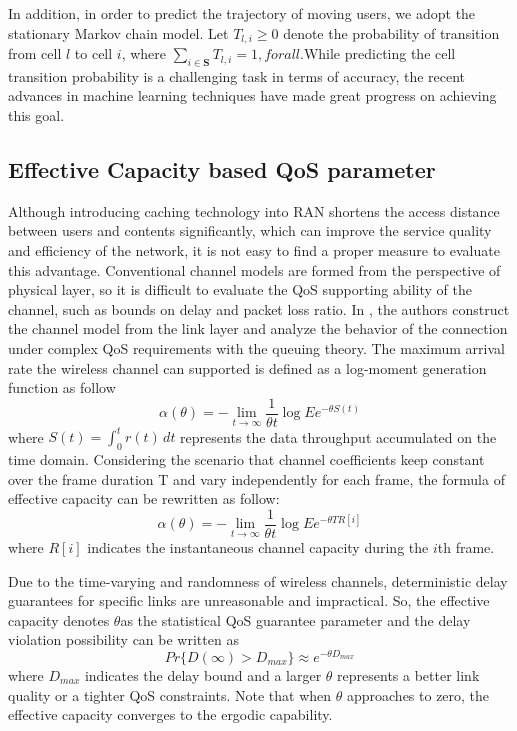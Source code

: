 \documentclass[conference]{IEEEtran}
\begin{document}
In addition, in order to predict the trajectory of moving users, we adopt the stationary Markov chain model. Let $T_{l,i}\ge 0$ denote the probability of transition from cell $l$ to cell $i$, where $\sum_{i\in\mathbf{S}}T_{l,i}=1, forall$.While predicting the cell transition probability is a challenging task in terms of accuracy, the recent advances in machine learning techniques have made great progress on achieving this goal.

\subsection{Effective Capacity based QoS parameter}
Although introducing caching technology into RAN shortens the access distance between users and contents significantly, which can improve the service quality and efficiency of the network, it is not easy to find a proper measure to evaluate this advantage. Conventional channel models are formed from the perspective of physical layer, so it is difficult to evaluate the QoS supporting ability of the channel, such as bounds on delay and packet loss ratio. In \cite{1210731}, the authors construct the channel model from the link layer and analyze the behavior of the connection under complex QoS requirements with the queuing theory. The maximum arrival rate the wireless channel can supported is defined as a log-moment generation function as follow
\begin{equation}
\alpha(\theta)=-\lim_{t \to \infty}\frac{1}{\theta t}\log E{e^{-\theta S(t)}}
\end{equation}
where $S(t)=\int_{0}^{t} r(t)\, dt$ represents the data throughput accumulated on the time domain. Considering the scenario that channel coefficients keep constant over the frame duration T and vary independently for each frame, the formula of effective capacity can be rewritten as follow:
\begin{equation}
\alpha(\theta)=-\lim_{t \to \infty}\frac{1}{\theta t}\log E{e^{-\theta TR[i]}}
\end{equation}
where $R[i]$ indicates the instantaneous channel capacity during the $i$th frame.

Due to the time-varying and randomness of wireless channels, deterministic delay guarantees for specific links are unreasonable and impractical. So, the effective capacity denotes
$\theta$as the statistical QoS guarantee parameter and the delay violation possibility can be written as
\begin{equation}
Pr\{D(\infty)>D_{max}\}\approx e^{-\theta D_{max}}
\end{equation}
where $D_{max}$ indicates the delay bound and a larger $\theta$ represents a better link quality or a tighter QoS constraints. Note that when $\theta$ approaches to zero, the effective capacity converges to the ergodic capability.
\end{document}
